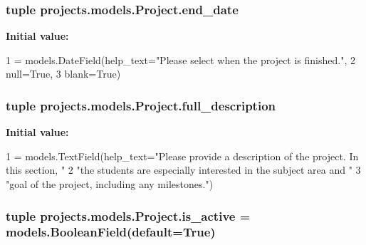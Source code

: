 \hypertarget{classprojects_1_1models_1_1_project_a7f570ace2dbd44b86ebab9b717258216}{
\subsubsection[{end\-\_\-date}]{\setlength{\rightskip}{0pt plus 5cm}tuple projects.\-models.\-Project.\-end\-\_\-date\hspace{0.3cm}{\ttfamily [static]}}}\label{classprojects_1_1models_1_1_project_a7f570ace2dbd44b86ebab9b717258216}
{\bfseries Initial value\-:}
\begin{DoxyCode}
1 = models.DateField(help\_text=\textcolor{stringliteral}{"Please select when the project is finished."},
2                                 null=\textcolor{keyword}{True},
3                                 blank=\textcolor{keyword}{True})
\end{DoxyCode}
\hypertarget{classprojects_1_1models_1_1_project_a0237877a127da9130ea51a2056443c26}{
\subsubsection[{full\-\_\-description}]{\setlength{\rightskip}{0pt plus 5cm}tuple projects.\-models.\-Project.\-full\-\_\-description\hspace{0.3cm}{\ttfamily [static]}}}\label{classprojects_1_1models_1_1_project_a0237877a127da9130ea51a2056443c26}
{\bfseries Initial value\-:}
\begin{DoxyCode}
1 = models.TextField(help\_text=\textcolor{stringliteral}{"Please provide a description of the project. In this section, "}
2                                                   \textcolor{stringliteral}{"the students are especially interested in the subject
       area and "}
3                                                   \textcolor{stringliteral}{"goal of the project, including any milestones."})
\end{DoxyCode}
\hypertarget{classprojects_1_1models_1_1_project_a0ba53281e7601f7aa470c5a7b3e71d6c}{
\subsubsection[{is\-\_\-active}]{\setlength{\rightskip}{0pt plus 5cm}tuple projects.\-models.\-Project.\-is\-\_\-active = models.\-Boolean\-Field(default=True)\hspace{0.3cm}{\ttfamily [static]}}}\label{classprojects_1_1models_1_1_project_a0ba53281e7601f7aa470c5a7b3e71d6c}
